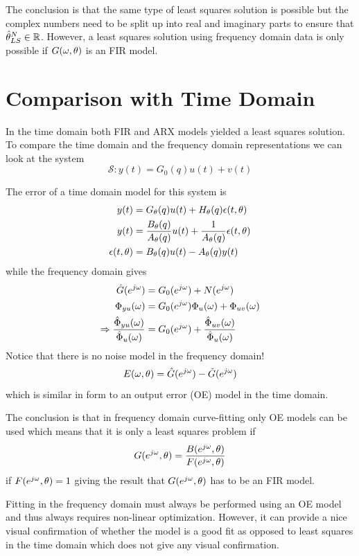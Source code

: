 The conclusion is that the same type of least squares solution is possible but the complex numbers need to be split up into real and imaginary parts to ensure that $\hat{\theta}_{LS}^N\in\mathbb{R}$. However, a least squares solution using frequency domain data is only possible if $G(\omega,\theta)$ is an FIR model.

\section{Comparison with Time Domain}
In the time domain both FIR and ARX models yielded a least squares solution. To compare the time domain and the frequency domain representations we can look at the system
$$\mathcal{S}: y(t) = G_0(q)u(t) + v(t)$$

The error of a time domain model for this system is
\begin{align*}
y(t) &= G_\theta(q) u(t)+H_\theta(q)\epsilon(t,\theta) \\
y(t) &= \frac{B_\theta(q)}{A_\theta(q)}u(t) + \frac{1}{A_\theta(q)}\epsilon(t,\theta) \\
\epsilon(t,\theta) &= B_\theta(q)u(t) - A_\theta(q)y(t)
\end{align*}
while the frequency domain gives
\begin{align*}
\hat{G}(e^{j\omega}) &= G_0(e^{j\omega}) + N(e^{j\omega}) \\
\Phi_{yu}(\omega) &= G_0(e^{j\omega})\Phi_u(\omega) + \Phi_{uv}(\omega) \\
\Rightarrow \frac{\hat{\Phi}_{yu}(\omega)}{\hat{\Phi}_u(\omega)} &= G_0(e^{j\omega}) + \frac{\hat{\Phi}_{uv}(\omega)}{\hat{\Phi}_u(\omega)}
\end{align*}
Notice that there is no noise model in the frequency domain!
$$E(\omega,\theta) = \hat{G}(e^{j\omega}) - \tilde{G}(e^{j\omega})$$
which is similar in form to an output error (OE) model in the time domain.

The conclusion is that in frequency domain curve-fitting only OE models can be used which means that it is only a least squares problem if
$$G(e^{j\omega},\theta) = \frac{B(e^{j\omega},\theta)}{F(e^{j\omega},\theta)}$$
if $F(e^{j\omega},\theta) = 1$ giving the result that $G(e^{j\omega},\theta)$ has to be an FIR model.

Fitting in the frequency domain must always be performed using an OE model and thus always requires non-linear optimization. However, it can provide a nice visual confirmation of whether the model is a good fit as opposed to least squares in the time domain which does not give any visual confirmation.

